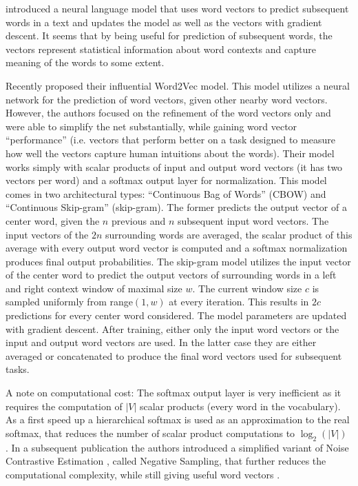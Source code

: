 \citet{Bengio2003} introduced a neural language model that uses
word vectors to predict subsequent words in a text and updates the
model as well as the vectors with gradient descent. It seems that
by being useful for prediction of subsequent words, the vectors represent
statistical information about word contexts and capture meaning of
the words to some extent.

Recently \citet{Mikolov2013a} proposed their influential Word2Vec model.
This model utilizes a neural network for the prediction of word vectors,
given other nearby word vectors. However, the authors focused on the
refinement of the word vectors only and were able to simplify the
net substantially, while gaining word vector ``performance'' (i.e.
vectors that perform better on a task designed to measure how well
the vectors capture human intuitions about the words). Their model
works simply with scalar products of input and output word vectors
(it has two vectors per word) and a softmax output layer for normalization.
This model comes in two architectural types: ``Continuous Bag of Words''
(CBOW) and ``Continuous Skip-gram'' (skip-gram). The former predicts
the output vector of a center word, given the $n$ previous and
$n$ subsequent input word vectors. The input vectors of the $2n$
surrounding words are averaged, the scalar product of this average
with every output word vector is computed and a softmax normalization
produces final output probabilities. The skip-gram model utilizes
the input vector of the center word to predict the output vectors
of surrounding words in a left and right context window of maximal
size $w$. The current window size $c$ is sampled uniformly from
range$(1,w)$ at every iteration. This results in $2c$ predictions
for every center word considered. The model parameters are updated
with gradient descent. After training, either only the input word vectors
or the input and output word vectors are used. In the latter case they are either averaged
or concatenated to produce the final word vectors used for subsequent
tasks. 

A note on computational cost: The softmax output layer is very inefficient
as it requires the computation of $|V|$ scalar products (every word
in the vocabulary). As a first speed up a hierarchical softmax \citep{Morin2005} is
used as an approximation to the real softmax, that reduces the number
of scalar product computations to $\log_{2}(|V|)$ \citep{Mikolov2013a}.
In a subsequent publication the authors introduced a
simplified variant of Noise Contrastive Estimation \citep{Gutmann2012}, called
Negative Sampling, that further reduces the computational complexity,
while still giving useful word vectors \citep{Mikolov2013b}. 

